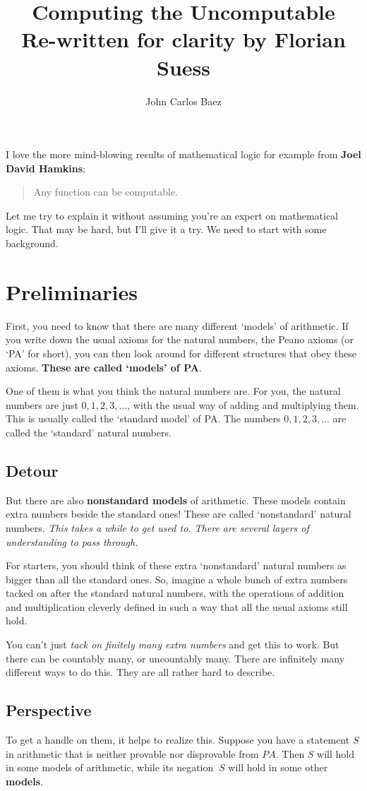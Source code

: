 \documentclass{article}
\author{John Carlos Baez}
\title{%
	Computing the Uncomputable \\
	\large Re-written for clarity by Florian Suess}
\begin{document}
\maketitle

I love the more mind-blowing results of mathematical logic for example from \textbf{Joel David Hamkins}; 
\blockquote{Any function can be computable.}

Let me try to explain it without assuming you’re an expert on mathematical logic. That may be hard, but I’ll give it a try. We need to start with some background.

\section*{Preliminaries}
First, you need to know that there are many different ‘models’ of arithmetic. If you write down the usual axioms for the natural numbers, the Peano axioms (or ‘PA’ for short), you can then look around for different structures that obey these axioms. \textbf{These are called ‘models’ of PA}.

One of them is what you think the natural numbers are. For you, the natural numbers are just $0, 1, 2, 3, ...$, with the usual way of adding and multiplying them. This is usually called the ‘standard model’ of PA. The numbers $0, 1, 2, 3, ...$ are called the ‘standard’ natural numbers.

\subsection*{Detour}
But there are also \textbf{nonstandard models} of arithmetic. These models contain extra numbers beside the standard ones! These are called ‘nonstandard’ natural numbers. \emph{This takes a while to get used to. There are several layers of understanding to pass through.}

For starters, you should think of these extra ‘nonstandard’ natural numbers as bigger than all the standard ones. So, imagine a whole bunch of extra numbers tacked on after the standard natural numbers, with the operations of addition and multiplication cleverly defined in such a way that all the usual axioms still hold.

You can’t just \emph{tack on finitely many extra numbers} and get this to work. But there can be countably many, or uncountably many. There are infinitely many different ways to do this. They are all rather hard to describe.

\subsection*{Perspective}
To get a handle on them, it helps to realize this. Suppose you have a statement $S$ in arithmetic that is neither provable nor disprovable from $PA$. Then $S$ will hold in some models of arithmetic, while its negation $~S$ will hold in some other \textbf{models}.
\end{document}
